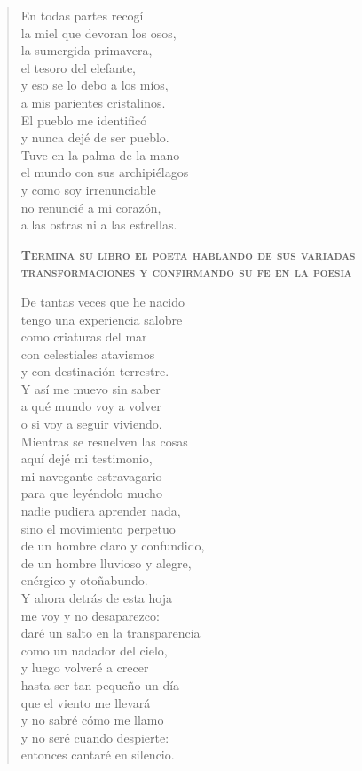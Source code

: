 \documentclass[12pt]{article}
\begin{document}
\begin{verse}
En todas partes recogí\\
la miel que devoran los osos,\\
la sumergida primavera,\\
el tesoro del elefante,\\
y eso se lo debo a los míos,\\
a mis parientes cristalinos.\\
El pueblo me identificó\\
y nunca dejé de ser pueblo.\\
Tuve en la palma de la mano\\
el mundo con sus archipiélagos\\
y como soy irrenunciable\\
no renuncié a mi corazón,\\
a las ostras ni a las estrellas.  

{\bfseries\scshape {Termina su libro el poeta hablando de sus variadas transformaciones y confirmando su fe en la poesía}}

De tantas veces que he nacido\\
tengo una experiencia salobre\\
como criaturas del mar\\
con celestiales atavismos\\
y con destinación terrestre.\\
Y así me muevo sin saber\\
a qué mundo voy a volver\\
o si voy a seguir viviendo.\\
Mientras se resuelven las cosas\\
aquí dejé mi testimonio,\\
mi navegante estravagario\\
para que leyéndolo mucho\\
nadie pudiera aprender nada,\\
sino el movimiento perpetuo\\
de un hombre claro y confundido,\\
de un hombre lluvioso y alegre,\\
enérgico y otoñabundo.\\
Y ahora detrás de esta hoja\\
me voy y no desaparezco:\\
daré un salto en la transparencia\\
como un nadador del cielo,\\
y luego volveré a crecer\\
hasta ser tan pequeño un día\\
que el viento me llevará\\
y no sabré cómo me llamo\\
y no seré cuando despierte:\\
entonces cantaré en silencio.  

\end{verse}
\end{document}
